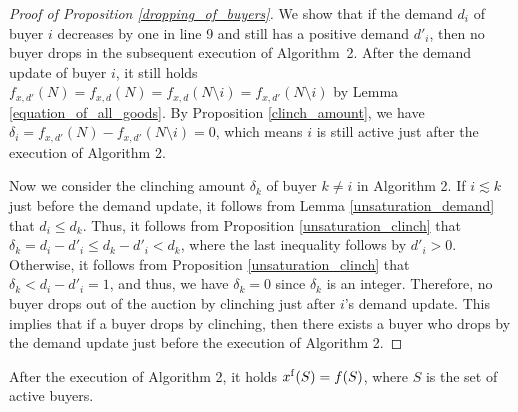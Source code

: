 \documentclass[letterpaper,11pt]{article}
\begin{document}
	\begin{proof}[Proof of Proposition \ref{dropping_of_buyers}] 
	We show that if the demand $d_i$ of buyer $i$ decreases 
	by one in line 9 and still has a positive demand $d'_i$,
	then no buyer drops in the subsequent execution of Algorithm~2.
	After the demand update of buyer $i$, it still holds  
	$f_{x,d'}(N)=f_{x,d}(N)=f_{x,d}(N\setminus i)=f_{x,d'}(N\setminus i)$ 
	by Lemma \ref{equation_of_all_goods}.
	By Proposition \ref{clinch_amount}, 
	we have $\delta_i=f_{x,d'}(N)-f_{x,d'}(N\setminus i)=0$, which means $i$ is still active 
	just after the execution of Algorithm 2.
	
	Now we consider the clinching amount $\delta_k$ of buyer $k\neq i$ in Algorithm 2.
	If $i\lesssim k$ just before the demand update, it follows from Lemma \ref{unsaturation_demand} that $d_i\leq d_k$.
	Thus, it follows from Proposition \ref{unsaturation_clinch} that 
	$\delta_k=d_i-d'_i\leq d_k-d'_i<d_k$, where the last inequality follows by $d'_i>0$.
	Otherwise, it follows from Proposition \ref{unsaturation_clinch} that $\delta_k<d_i-d'_i=1$,
	and thus, we have $\delta_k=0$ since $\delta_k$ is an integer.
	Therefore, no buyer drops out of the auction by clinching just after $i$'s demand update.
	This implies that if a buyer drops by clinching, 
	then there exists a buyer who drops by the demand update 
	just before the execution of Algorithm 2.
	\end{proof}
	\begin{proposition}
	\label{active_buyers_tight}
	After the execution of Algorithm 2, it holds $x^{\rm f}(S) = f(S)$, where $S$ is the set of active buyers.
	\end{proposition}
	
\end{document}
